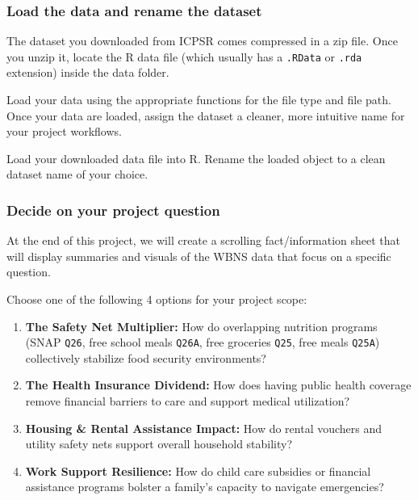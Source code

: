 \documentclass[
  letterpaper,
  DIV=11,
  numbers=noendperiod]{scrartcl}
\providecommand{\tightlist}{%
  \setlength{\itemsep}{0pt}\setlength{\parskip}{0pt}}
\begin{document}
\subsubsection{Load the data and rename the
dataset}\label{load-the-data-and-rename-the-dataset}

The dataset you downloaded from ICPSR comes compressed in a zip file.
Once you unzip it, locate the R data file (which usually has a
\texttt{.RData} or \texttt{.rda} extension) inside the data folder.

Load your data using the appropriate functions for the file type and
file path. Once your data are loaded, assign the dataset a cleaner, more
intuitive name for your project workflows.

\begin{tcolorbox}[enhanced jigsaw, arc=.35mm, bottomrule=.15mm, bottomtitle=1mm, breakable, colback=white, colbacktitle=quarto-callout-important-color!10!white, colframe=quarto-callout-important-color-frame, coltitle=black, left=2mm, leftrule=.75mm, opacityback=0, opacitybacktitle=0.6, rightrule=.15mm, title=\textcolor{quarto-callout-important-color}{\faExclamation}\hspace{0.5em}{Task}, titlerule=0mm, toprule=.15mm, toptitle=1mm]

Load your downloaded data file into R. Rename the loaded object to a
clean dataset name of your choice.

\end{tcolorbox}

\subsubsection{Decide on your project
question}\label{decide-on-your-project-question}

At the end of this project, we will create a scrolling fact/information
sheet that will display summaries and visuals of the WBNS data that
focus on a specific question.

Choose one of the following 4 options for your project scope:

\begin{enumerate}
\def\labelenumi{\arabic{enumi}.}
\tightlist
\item
  \textbf{The Safety Net Multiplier:} How do overlapping nutrition
  programs (SNAP \texttt{Q26}, free school meals \texttt{Q26A}, free
  groceries \texttt{Q25}, free meals \texttt{Q25A}) collectively
  stabilize food security environments?
\item
  \textbf{The Health Insurance Dividend:} How does having public health
  coverage remove financial barriers to care and support medical
  utilization?
\item
  \textbf{Housing \& Rental Assistance Impact:} How do rental vouchers
  and utility safety nets support overall household stability?
\item
  \textbf{Work Support Resilience:} How do child care subsidies or
  financial assistance programs bolster a family's capacity to navigate
  emergencies?
\end{enumerate}
\end{document}
